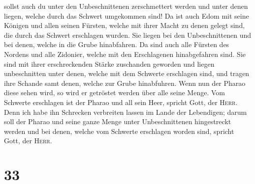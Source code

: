sollst auch du unter den Unbeschnittenen zerschmettert werden und unter
denen liegen, welche durch das Schwert umgekommen sind! 
Da ist auch Edom mit seine Königen und allen seinen Fürsten, welche mit
ihrer Macht zu denen gelegt sind, die durch das Schwert erschlagen
wurden. Sie liegen bei den Unbeschnittenen und bei denen, welche in die
Grube hinabfahren.  Da sind auch alle Fürsten des Nordens
und alle Zidonier, welche mit den Erschlagenen hinabgefahren sind. Sie
sind mit ihrer erschreckenden Stärke zuschanden geworden und liegen
unbeschnitten unter denen, welche mit dem Schwerte erschlagen sind, und
tragen ihre Schande samt denen, welche zur Grube hinabfuhren.
 Wenn nun der Pharao diese sehen wird, so wird er
getröstet werden über alle seine Menge. Vom Schwerte erschlagen ist der
Pharao und all sein Heer, spricht Gott, der \textsc{Herr}.
 Denn ich habe ihn Schrecken verbreiten lassen im Lande
der Lebendigen; darum soll der Pharao und seine ganze Menge unter
Unbeschnittenen hingestreckt werden und bei denen, welche vom Schwerte
erschlagen worden sind, spricht Gott, der \textsc{Herr}.

\hypertarget{section-32}{%
\section{33}\label{section-32}}

